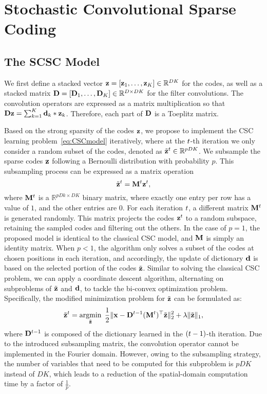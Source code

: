 \section{Stochastic Convolutional Sparse Coding}
\subsection{The SCSC Model}
We first define a stacked vector $\code = [\code_1, \dots, \code_K]
\in \mathbb{R}^{DK}$ for the codes, as well as a stacked matrix
$\Filter = [\Filter_1, \dots, \Filter_K] \in \mathbb{R}^{D \times DK}$
for the filter convolutions. The convolution operators are expressed
as a matrix multiplication so that $ \Filter \code = \sum_{k=1}^{K}
\filter_k * \code_k$.  Therefore, each part of $\Filter$ is a Toeplitz
matrix.

Based on the strong sparsity of the codes $\code$, we propose to
implement the CSC learning problem~\eqref{eq:CSCmodel} iteratively,
where at the $t$-th iteration we only consider a random subset of
the codes, denoted as $\subcode^t\in \mathbb{R}^{pDK}$.  We subsample
the sparse codes $\code$ following a Bernoulli distribution with
probability $p$. This subsampling process can be expressed as a matrix
operation
\begin{equation}
    \subcode^t = \mask^{\ite} \code^\ite,
\end{equation}
where $\mask^{\ite}$ is a $\mathbb{R}^{pDk \times DK}$ binary matrix,
where exactly one entry per row has a value of $1$, and the other
entries are $0$. For each iteration $t$, a different matrix
$\mask^{\ite}$ is generated randomly. This matrix projects the
codes $\code^\ite$ to a random subspace, retaining the sampled codes
and filtering out the others. In the case of $p=1$, the proposed model
is identical to the classical CSC model, and $\mask$ is simply an
identity matrix. When $p<1$, the algorithm only solves a subset of the
codes at chosen positions in each iteration, and accordingly, the
update of dictionary $\filter$ is based on the selected portion of the
codes $\subcode$. Similar to solving the classical CSC problem, we can
apply a coordinate descent algorithm, alternating on subproblems of
$\subcode$ and $\filter$, to tackle the bi-convex optimization
problem. Specifically, the modified minimization problem for
$\subcode$ can be formulated as:
\begin{equation} \label{eq:updatingCode}
    \subcode^{\ite} = \minimize{\subcode} \frac{1}{2}\| \signal - \Filter^{\ite-1} (\mask^{\ite})^\top \subcode \|_2^2 + \lambda \| \subcode \|_1,
\end{equation}
where $\Filter^{\ite-1}$ is composed of the dictionary learned in the
$(t-1)$-th iteration.
 Due to the introduced subsampling matrix, the convolution
operator cannot be implemented in the Fourier domain. However, owing
to the subsampling strategy, the number of variables that need to be
computed for this subproblem is $pDK$ instead of $DK$, which leads to
a reduction of the spatial-domain computation time by a factor of
$\frac{1}{p}$.

